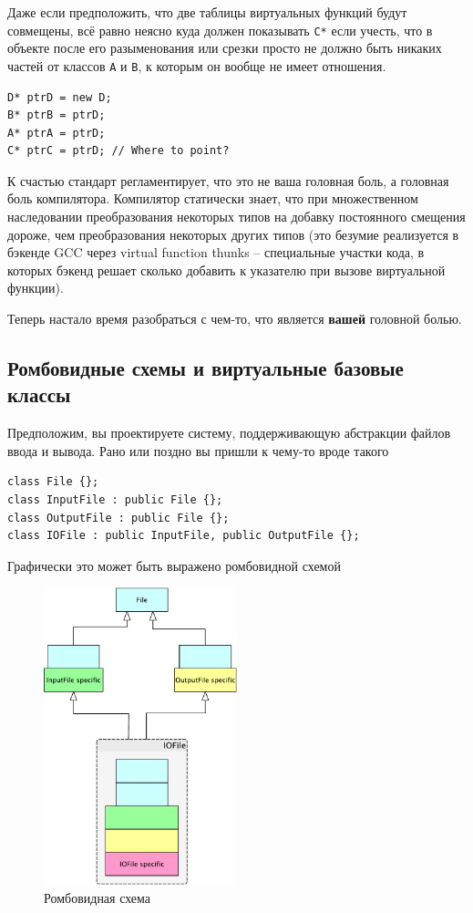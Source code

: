 \documentclass[a4paper,12pt,oneside]{book}
\begin{document}
Даже если предположить, что две таблицы виртуальных функций будут совмещены, всё равно неясно куда должен показывать \lstinline!С*! если учесть, что в объекте после его разыменования или срезки просто не должно быть никаких частей от классов \lstinline!A! и \lstinline!B!, к которым он вообще не имеет отношения.

\begin{lstlisting}
D* ptrD = new D;
B* ptrB = ptrD;
A* ptrA = ptrD;
C* ptrC = ptrD; // Where to point?
\end{lstlisting}

К счастью стандарт регламентирует, что это не ваша головная боль, а головная боль компилятора. Компилятор статически знает, что при множественном наследовании преобразования некоторых типов на добавку постоянного смещения дороже, чем преобразования некоторых других типов (это безумие реализуется в бэкенде GCC через virtual function thunks -- специальные участки кода, в которых бэкенд решает сколько добавить к указателю при вызове виртуальной функции).

Теперь настало время разобраться с чем-то, что является \textbf{вашей} головной болью.

\subsection{Ромбовидные схемы и виртуальные базовые классы}\label{RombSchemas}

Предположим, вы проектируете систему, поддерживающую абстракции файлов ввода и вывода. Рано или поздно вы пришли к чему-то вроде такого

\begin{lstlisting}
class File {};
class InputFile : public File {};
class OutputFile : public File {};
class IOFile : public InputFile, public OutputFile {};
\end{lstlisting}

Графически это может быть выражено ромбовидной схемой

\begin{figure}[h!]
\centering
\includegraphics[width=0.5\textwidth]{illustrations/romb-crop.pdf}
\caption{Ромбовидная схема}
\label{fig:romb-crop}
\end{figure}
\end{document}
